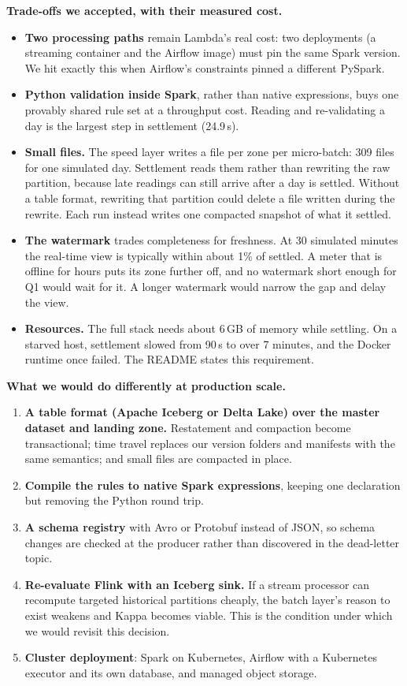 \documentclass[11pt,a4paper]{article}
\newcommand{\code}[1]{\texttt{\detokenize{#1}}}
\newcommand{\sq}{Q}
\begin{document}
\textbf{Trade-offs we accepted, with their measured cost.}
\begin{itemize}
  \item \textbf{Two processing paths} remain Lambda's real cost: two deployments (a
  streaming container and the Airflow image) must pin the same Spark version. We hit
  exactly this when Airflow's constraints pinned a different PySpark.
  \item \textbf{Python validation inside Spark}, rather than native expressions, buys one
  provably shared rule set at a throughput cost. Reading and re-validating a day is
  the largest step in settlement (24.9\,s).
  \item \textbf{Small files.} The speed layer writes a file per zone per micro-batch: 309
  files for one simulated day. Settlement reads them rather than rewriting the raw
  partition, because late readings can still arrive after a day is settled. Without
  a table format, rewriting that partition could delete a file written during the
  rewrite. Each run instead writes one compacted snapshot of what it settled.
  \item \textbf{The watermark} trades completeness for freshness. At 30 simulated minutes
  the real-time view is typically within about 1\% of settled. A meter that is offline
  for hours puts its zone further off, and no watermark short enough for \sq1 would
  wait for it. A longer watermark would narrow the gap and delay the view.
  \item \textbf{Resources.} The full stack needs about 6\,GB of memory while settling.
  On a starved host, settlement slowed from 90\,s to over 7 minutes, and the Docker
  runtime once failed. The README states this requirement.
\end{itemize}

\textbf{What we would do differently at production scale.}
\begin{enumerate}
  \item \textbf{A table format (Apache Iceberg or Delta Lake) over the master dataset and landing
  zone.} Restatement and compaction become transactional; time travel replaces our
  version folders and manifests with the same semantics; and small files are compacted
  in place.
  \item \textbf{Compile the \code{FieldSpec} rules to native Spark expressions}, keeping one
  declaration but removing the Python round trip.
  \item \textbf{A schema registry} with Avro or Protobuf instead of JSON, so schema changes are
  checked at the producer rather than discovered in the dead-letter topic.
  \item \textbf{Re-evaluate Flink with an Iceberg sink.} If a stream processor can recompute
  targeted historical partitions cheaply, the batch layer's reason to exist weakens and
  Kappa becomes viable. This is the condition under which we would revisit this decision.
  \item \textbf{Cluster deployment}: Spark on Kubernetes, Airflow with a Kubernetes executor
  and its own database, and managed object storage.
\end{enumerate}
\end{document}
